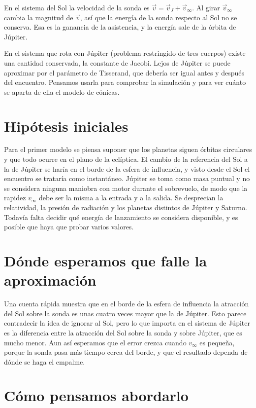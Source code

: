 \documentclass[12pt,letterpaper]{article}
\begin{document}
En el sistema del Sol la velocidad de la sonda es $\vec v = \vec v_J + \vec v_\infty$. Al
girar $\vec v_\infty$ cambia la magnitud de $\vec v$, así que la energía de la sonda respecto
al Sol no se conserva. Esa es la ganancia de la asistencia, y la energía sale de la órbita de
Júpiter.

En el sistema que rota con Júpiter (problema restringido de tres cuerpos) existe una
cantidad conservada, la constante de Jacobi. Lejos de Júpiter se puede aproximar por el
parámetro de Tisserand, que debería ser igual antes y después del encuentro. Pensamos usarla
para comprobar la simulación y para ver cuánto se aparta de ella el modelo de cónicas.

\section{Hipótesis iniciales}

Para el primer modelo se piensa suponer que los planetas siguen órbitas circulares y que
todo ocurre en el plano de la eclíptica. El cambio de la referencia del Sol a la de Júpiter
se haría en el borde de la esfera de influencia, y visto desde el Sol el encuentro se
trataría como instantáneo. Júpiter se toma como masa puntual y no se considera ninguna
maniobra con motor durante el sobrevuelo, de modo que la rapidez $v_\infty$ debe ser la misma
a la entrada y a la salida. Se desprecian la relatividad, la presión de radiación y los
planetas distintos de Júpiter y Saturno. Todavía falta decidir qué energía de lanzamiento
se considera disponible, y es posible que haya que probar varios valores.

\section{Dónde esperamos que falle la aproximación}

Una cuenta rápida muestra que en el borde de la esfera de influencia la atracción del Sol
sobre la sonda es unas cuatro veces mayor que la de Júpiter. Esto parece contradecir la idea
de ignorar al Sol, pero lo que importa en el sistema de Júpiter es la diferencia entre la
atracción del Sol sobre la sonda y sobre Júpiter, que es mucho menor. Aun así esperamos que
el error crezca cuando $v_\infty$ es pequeña, porque la sonda pasa más tiempo cerca del borde,
y que el resultado dependa de dónde se haga el empalme.

\section{Cómo pensamos abordarlo}
\end{document}
